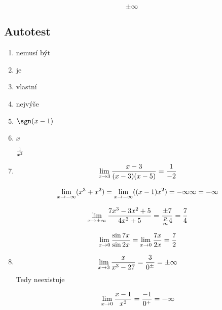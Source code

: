 $$\pm \infty$$


\subsection{Autotest}
\begin{enumerate}
	\item nemusí být
	\item je
	\item vlastní
	\item nejvýše
	\item $\sgn(x-1)$
	\item $x$

		$\frac 1 {x^2}$
	\item 
		$$
		\lim_{x\rightarrow 3} \frac{x-3}{(x-3)(x-5)} = \frac 1{-2}
		$$

		$$
		\lim_{x\r -\infty} (x^3+x^2)
		=
		\lim_{x\r -\infty} ((x-1)x^2)
		= -\infty \* \infty = -\infty
		$$

		$$
		\lim_{x\rightarrow \pm\infty} \frac{7x^3-3x^2+5}{4x^3+5}
		=
		\frac{\pm 7}{\frac pm 4} = \frac74
		$$

		$$
		\lim_{x\rightarrow 0} \frac{\sin 7x}{\sin 2x}
		=
		\lim_{x\rightarrow 0} \frac{7x}{2x}
		=
		 \frac{7}{2}
		 $$

	 \item 
		 $$
		\lim_{x\rightarrow 3} \frac{x}{x^3-27} = \frac3{0^\pm} = \pm \infty
		$$ Tedy neexistuje


		$$
		\lim_{x\rightarrow 0} \frac{x-1}{x^2} = \frac{-1}{0^+} = -\infty
		$$
\end{enumerate}




\EndDoc

